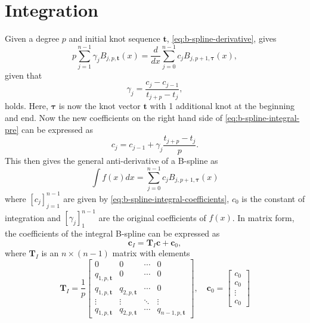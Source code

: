 \section{Integration}
Given a degree $p$ and initial knot sequence $\mathbf t$, \cref{eq:b-spline-derivative}, gives
\begin{equation}\label{eq:b-spline-integral-pre}
    p \sum_{j=1}^{n-1} \gamma_j B_{j, p, \boldsymbol{t}}(x) 
    = \frac{d}{dx} \sum_{j=0}^{n-1} c_j B_{j, p+1, \boldsymbol{\tau}}(x),
\end{equation}
given that
\begin{equation}
    \gamma_j = \frac{c_j-c_{j-1}}{t_{j+p}-t_j},
\end{equation}
holds. Here, $\boldsymbol{\tau}$ is now the knot vector $\mathbf{t}$ with 1 additional knot at the beginning and end. Now
the new coefficients on the right hand side of \cref{eq:b-spline-integral-pre} can be expressed as 
\begin{equation}\label{eq:b-spline-integral-coefficients}
    c_j = c_{j-1} + \gamma_j \frac{t_{j+p}-t_j}{p}.
\end{equation}
This then gives the general anti-derivative of a B-spline as
\begin{equation}\label{eq:b-spline-integral}
    \int f(x) dx = \sum_{j=0}^{n-1} c_j B_{j, p+1, \boldsymbol{\tau}}(x)
\end{equation}
where $[c_j]_{j=1}^{n-1}$ are given by \cref{eq:b-spline-integral-coefficients}, $c_0$ is the constant of integration and $[\gamma_j]_1^{n-1}$ are the original coefficients of $f(x)$. In matrix form, the coefficients of the integral B-spline can be expressed as
\begin{equation}\label{eq:b-spline-integral-matrix}
    \mathbf{c}_I = \mathbf T_I \mathbf{c} + \mathbf{c}_0,
\end{equation}
where $\mathbf T_I$ is an $n \times (n-1)$ matrix with elements
\begin{equation}
    \mathbf T_I = \frac{1}{p}\begin{bmatrix}
        0 & 0 & \cdots & 0 \\
        q_{1,p,\mathbf{t}} & 0 & \cdots & 0 \\
        q_{1,p,\mathbf{t}} & q_{2,p,\mathbf{t}} & \cdots & 0 \\
        \vdots & \vdots & \ddots & \vdots \\
        q_{1,p,\mathbf{t}} & q_{2,p,\mathbf{t}} & \cdots & q_{n-1,p,\mathbf{t}}
    \end{bmatrix},\quad
    \mathbf{c}_0 = \begin{bmatrix}
        c_0 \\
        c_0 \\
        \vdots \\
        c_0
    \end{bmatrix}
\end{equation}

